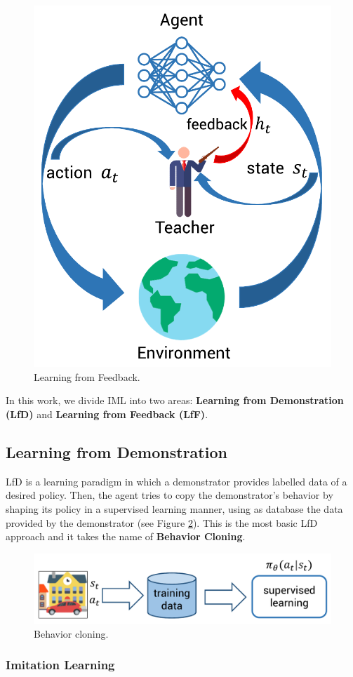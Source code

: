 \begin{figure}[h]
    \centering
    \includegraphics[width=0.5\linewidth]{imagenes/cap1/LfF.pdf}
    \caption{Learning from Feedback.}
    \label{fig:LfF}
\end{figure}

In this work, we divide IML into two areas: \textbf{Learning from Demonstration (LfD)} and \textbf{Learning from Feedback (LfF)}. 

\subsection{Learning from Demonstration}

LfD is a learning paradigm in which a demonstrator provides labelled data of a desired policy. Then, the agent tries to copy the demonstrator's behavior by shaping its policy in a supervised learning manner, using as database the data provided by the demonstrator (see Figure \ref{fig:b_cloning}). This is the most basic LfD approach and it takes the name of \textbf{Behavior Cloning}.

\begin{figure}[h]
    \centering
    \includegraphics[width=0.8\linewidth]{imagenes/cap1/b_cloning.pdf}
    \caption{Behavior cloning.}
    \label{fig:b_cloning}
\end{figure}

\subsubsection{Imitation Learning}

